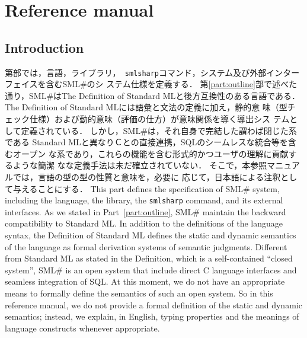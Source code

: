 \documentclass{jbook}
\newcommand{\txt}[2]{#2}
\newcommand{\smlsharp}{SML\#}
\begin{document}
\part{\txt{参照マニュアル}{Reference manual}}
\label{part:referenceManual}
        
\chapter{\txt{序論}{Introduction}}
\label{chap:reference:intro}


\ifjp%
	第\ref{part:referenceManual}部では，言語，ライブラリ，{\tt
smlsharp}コマンド，システム及び外部インターフェイスを含む\smlsharp{}のシ
ステム仕様を定義する．
	第\ref{part:outline}部で述べた通り，\smlsharp{}はThe Definition
of Standard ML\cite{sml}と後方互換性のある言語である．
	The Definition of Standard MLには語彙と文法の定義に加え，静的意
味（型チェック仕様）および動的意味（評価の仕方）が意味関係を導く導出シス
テムとして定義されている．
	しかし，\smlsharp{}は，それ自身で完結した謂わば閉じた系である
Standard MLと異なりＣとの直接連携，SQLのシームレスな統合等を含むオープン
な系であり，これらの機能を含む形式的かつユーザの理解に貢献するような簡潔
なな定義手法は未だ確立されていない．
	そこで，本参照マニュアルでは，言語の型の型の性質と意味を，必要に
応じて，日本語による注釈として与えることにする．
\else%
	This part defines the specification of \smlsharp{} system,
including the language, the library, the {\tt smlsharp} command, and its 
external interfaces.
	As we stated in Part~\ref{part:outline}, \smlsharp{} maintain
the backward compatibility to Standard ML.
	 In addition to the definitions of the language syntax, the
Definition of Standard ML \cite{sml} defines the static and dynamic
semantics of the language as formal derivation systems of semantic
judgments.
	Different from Standard ML as stated in the Definition, which is
a self-contained ``closed system'', \smlsharp{} is an open system that
include direct C language interfaces and seamless integration of SQL.
	At this moment, we do not have an appropriate means to formally
define the semantics of such an open system.
	So in this reference manual, we do not provide a formal
definition of the static and dynamic semantics; instead, we explain, in
English, typing properties and the meanings of language constructs
whenever appropriate.
\fi%
\end{document}
